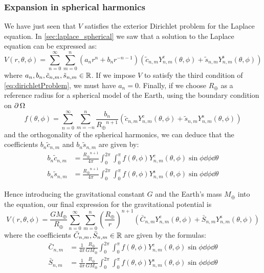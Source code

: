 \documentclass[../main.tex]{subfiles}
\begin{document}
\subsubsection{Expansion in spherical harmonics}\label{sec:laplace_spherical_potential}
We have just seen that $V$ satisfies the exterior Dirichlet problem for the Laplace equation. In \cref{sec:laplace_spherical} we saw that a solution to the Laplace equation can be expressed as:
\begin{equation}\label{eq:prePotential}
  V(r,\theta,\phi) = \sum_{n=0}^\infty \sum_{m=0}^n (a_n r^{n} +b_{n}r^{-n-1})(\tilde{c}_{n,m}Y_{n,m}^{\mathrm{c}}(\theta,\phi)+\tilde{s}_{n,m}Y_{n,m}^{\mathrm{s}}(\theta,\phi))
\end{equation}
where $a_n,b_n,\tilde{c}_{n,m},\tilde{s}_{n,m}\in\mathbb{R}$. If we impose $V$ to satisfy the third condition of \cref{eq:dirichletProblem}, we must have $a_{n}=0$.
Finally, if we choose $R_\oplus$ as a reference radius for a spherical model of the Earth, using the boundary condition on $\operatorname{\partial}{\Omega}$
\begin{equation}
  f(\theta,\phi) = \sum_{n=0}^\infty \sum_{m=-n}^n \frac{b_{n}}{{R_\oplus}^{n+1}}(\tilde{c}_{n,m}Y_{n,m}^{\mathrm{c}}(\theta,\phi)+\tilde{s}_{n,m}Y_{n,m}^{\mathrm{s}}(\theta,\phi))
\end{equation}
and the orthogonality of the spherical harmonics, we can deduce that the coefficients $b_n\tilde{c}_{n,m}$ and $b_n\tilde{s}_{n,m}$ are given by:
\begin{align}
  b_n\tilde{c}_{n,m} & =\frac{{R_\oplus}^{n+1}}{4\pi}\int_0^{2\pi}\int_0^\pi f(\theta,\phi) Y_{n,m}^\mathrm{c}(\theta,\phi)\sin\phi\dd{\phi}\dd{\theta} \\
  b_n\tilde{s}_{n,m} & =\frac{{R_\oplus}^{n+1}}{4\pi}\int_0^{2\pi}\int_0^\pi f(\theta,\phi) Y_{n,m}^\mathrm{s}(\theta,\phi)\sin\phi\dd{\phi}\dd{\theta}
\end{align}

Hence introducing the gravitational constant $G$ and the Earth's mass $M_\oplus$ into the equation, our final expression for the gravitational potential is
\begin{equation}\label{eq:Potential}
  V(r,\theta,\phi) =\frac{GM_\oplus}{R_\oplus}\sum_{n=0}^\infty \sum_{m=0}^n{\left(\frac{{R_\oplus}}{r}\right)}^{n+1}(\bar{C}_{n,m}Y_{n,m}^{\mathrm{c}}(\theta,\phi)+\bar{S}_{n,m}Y_{n,m}^{\mathrm{s}}(\theta,\phi))
\end{equation}
where the coefficients $\bar{C}_{n,m},\bar{S}_{n,m}\in\mathbb{R}$ are given by the formulas:
\begin{align}
  \bar{C}_{n,m} & =\frac{1}{4\pi}\frac{R_\oplus}{G M_\oplus}\int_0^{2\pi}\int_0^\pi f(\theta,\phi)  Y_{n,m}^\mathrm{c}(\theta,\phi)\sin\phi\dd{\phi}\dd{\theta} \\
  \bar{S}_{n,m} & =\frac{1}{4\pi}\frac{R_\oplus}{G M_\oplus}\int_0^{2\pi}\int_0^\pi f(\theta,\phi)  Y_{n,m}^\mathrm{s}(\theta,\phi)\sin\phi\dd{\phi}\dd{\theta}
\end{align}
\end{document}
